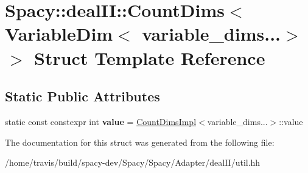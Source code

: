 \hypertarget{structSpacy_1_1dealII_1_1CountDims_3_01VariableDim_3_01variable__dims_8_8_8_4_01_4}{\section{Spacy\-:\-:deal\-I\-I\-:\-:Count\-Dims$<$ Variable\-Dim$<$ variable\-\_\-dims...$>$ $>$ Struct Template Reference}
\label{structSpacy_1_1dealII_1_1CountDims_3_01VariableDim_3_01variable__dims_8_8_8_4_01_4}
}
\subsection*{Static Public Attributes}
\begin{DoxyCompactItemize}
\item 
\hypertarget{structSpacy_1_1dealII_1_1CountDims_3_01VariableDim_3_01variable__dims_8_8_8_4_01_4_a6a6daaf3ed31647cc5ed6dae709a77e0}{static const constexpr int {\bfseries value} = \hyperlink{structSpacy_1_1dealII_1_1CountDimsImpl}{Count\-Dims\-Impl}$<$variable\-\_\-dims...$>$\-::value}\label{structSpacy_1_1dealII_1_1CountDims_3_01VariableDim_3_01variable__dims_8_8_8_4_01_4_a6a6daaf3ed31647cc5ed6dae709a77e0}

\end{DoxyCompactItemize}


The documentation for this struct was generated from the following file\-:\begin{DoxyCompactItemize}
\item 
/home/travis/build/spacy-\/dev/\-Spacy/\-Spacy/\-Adapter/deal\-I\-I/util.\-hh\end{DoxyCompactItemize}
